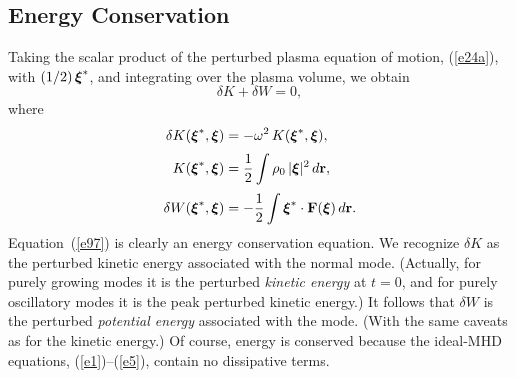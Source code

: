 \documentclass[12pt,prb,aps,notitlepage]{revtex4-1}
\newcommand{\bxi}{\mbox{\boldmath$\xi$}}
\begin{document}
\subsection{Energy Conservation}
Taking the scalar product of the perturbed plasma equation of motion, (\ref{e24a}), with $(1/2)\,\bxi^\ast$, and integrating over the
plasma volume, we obtain
\begin{equation}\label{e97}
\delta K +\delta W = 0,
\end{equation}
where
\begin{align}
\delta K(\bxi^\ast,\bxi) &= -\omega^2\,K(\bxi^\ast,\bxi),\\[0.5ex]
K(\bxi^\ast,\bxi) &= \frac{1}{2}\int\rho_0\,|\bxi|^2\,d{\bf r},\label{e99}\\[0.5ex]
\delta W(\bxi^\ast,\bxi) &= -\frac{1}{2}\int \bxi^\ast\cdot {\bf F}(\bxi)\,d{\bf r}.\label{e100}
\end{align}
Equation~(\ref{e97}) is clearly an energy conservation equation. We recognize $\delta K$ as the perturbed kinetic
energy associated with the normal mode. (Actually, for purely growing modes it is the perturbed {\em kinetic energy}\/ at $t=0$, and
for purely oscillatory modes it is the peak perturbed kinetic energy.) It follows that $\delta W$ is the perturbed {\em potential
energy}\/ associated with the mode. (With the same caveats as for the kinetic energy.)  Of course, energy is conserved because
the ideal-MHD equations, (\ref{e1})--(\ref{e5}), contain no dissipative terms. 
\end{document}
